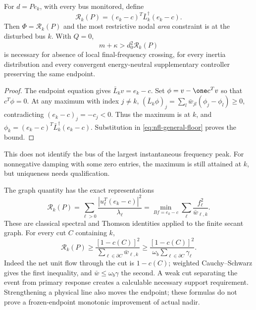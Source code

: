 \begin{theorem}
For $d=P e_k$, with every bus monitored, define
\begin{equation}
 \mathcal R_k(P)=(e_k-c)^T\bar L_k^\dagger(e_k-c).
 \label{eq:nfl-resistance}
\end{equation}
Then $\Phi=\mathcal R_k(P)$ and the most restrictive nodal \emph{area}
constraint is at the disturbed bus $k$. With $Q=0$,
\begin{equation}
 \boxed{m+\kappa>d_0^2\mathcal R_k(P)}
 \label{eq:nfl-local-floor}
\end{equation}
is necessary for absence of local final-frequency crossing, for every
inertia distribution and every convergent energy-neutral supplementary
controller preserving the same endpoint.
\end{theorem}
\begin{proof}
The endpoint equation gives $\bar L_kv=e_k-c$.
Set $\phi=v-\one c^Tv$ so that $c^T\phi=0$.
At any maximum with index $j\ne k$,
$(\bar L_k\phi)_j=\sum_l\bar w_{jl}(\phi_j-\phi_l)\geq0$,
contradicting $(e_k-c)_j=-c_j<0$.
Thus the maximum is at $k$, and
$\phi_k=(e_k-c)^T\bar L_k^\dagger(e_k-c)$.
Substitution in \eqref{eq:nfl-general-floor} proves the bound.
\end{proof}
This does not identify the bus of the largest instantaneous frequency peak.
For nonnegative damping with some zero entries, the maximum is still
attained at $k$, but uniqueness needs qualification.

The graph quantity has the exact representations
\begin{equation}
 \mathcal R_k(P)=
 \sum_{\ell>0}\frac{|u_\ell^T(e_k-c)|^2}{\lambda_\ell}
 =\min_{Bf=e_k-c}\sum_\ell\frac{f_\ell^2}{\bar w_{\ell,k}}.
 \label{eq:nfl-gsp-flow}
\end{equation}
These are classical spectral and Thomson identities applied to the
finite secant graph. For every cut $C$ containing $k$,
\begin{equation}
 \mathcal R_k(P)\geq
 \frac{[1-c(C)]^2}{\sum_{\ell\in\partial C}\bar w_{\ell,k}}
 \geq\frac{[1-c(C)]^2}
                {\omega_b\sum_{\ell\in\partial C}\gamma_\ell}.
 \label{eq:nfl-cut}
\end{equation}
Indeed the net unit flow through the cut is $1-c(C)$; weighted
Cauchy--Schwarz gives the first inequality, and $\bar w\leq\omega_b\gamma$
the second. A weak cut separating the event from primary response creates
a calculable necessary support requirement. Strengthening a physical line
also moves the endpoint; these formulas do not prove a frozen-endpoint
monotonic improvement of actual nadir.


